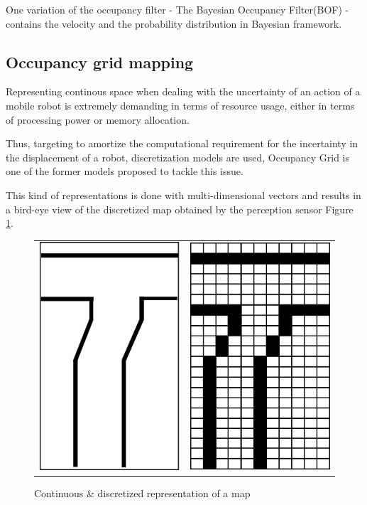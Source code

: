 One variation of the occupancy filter - The Bayesian Occupancy Filter(BOF) - contains the velocity and the probability distribution in Bayesian framework.

\subsection{Occupancy grid mapping}

Representing continous space when dealing with the uncertainty of an action of a mobile robot is extremely demanding in terms of resource usage, either in terms of processing power or memory allocation.

Thus, targeting to amortize the computational requirement for the incertainty in the displacement of a robot, discretization models are used, Occupancy Grid\cite{Elfes:1989:UOG:68491.68495} is one of the former models proposed to tackle this issue.

This kind of representations is done with multi-dimensional vectors and results in a bird-eye view of the discretized map obtained by the perception sensor Figure \ref{fig:grid:continuous:discretized}.


\begin{figure}[h]
\centering
	\begin{tabular}{lr}\\
		\includegraphics[width=0.25\columnwidth]{img/fig:grid:continuous} &
		\includegraphics[width=0.25\columnwidth]{img/fig:grid:discretized}
	\end{tabular}
	\caption{Continuous \& discretized representation of a map}
	\label{fig:grid:continuous:discretized}
\end{figure}


